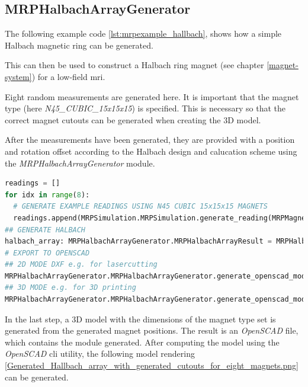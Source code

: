 \hypertarget{mrphalbacharraygenerator}{%
\subsection{MRPHalbachArrayGenerator}\label{mrphalbacharraygenerator}}

The following example code \ref{lst:mrpexample_hallbach}, shows how a
simple Halbach magnetic ring can be generated.

This can then be used to construct a Halbach ring magnet (see chapter
\ref{magnet-system}) for a low-field \gls{mri}.

Eight random measurements are generated here. It is important that the
magnet type (here \emph{N45\_CUBIC\_15x15x15}) is specified. This is
necessary so that the correct magnet cutouts can be generated when
creating the 3D model.

After the measurements have been generated, they are provided with a
position and rotation offset according to the Halbach design and
calucation scheme \cite{HallbachMagnetDesignPaper} using the
\emph{MRPHalbachArrayGenerator} module.

\begin{lstlisting}[language=Python, caption={MRPHalbachArrayGenerator example for generating an OpenSCAD based halbach ring}, label=lst:mrpexample_halbach]
readings = []
for idx in range(8):
  # GENERATE EXAMPLE READINGS USING N45 CUBIC 15x15x15 MAGNETS
  readings.append(MRPSimulation.MRPSimulation.generate_reading(MRPMagnetTypes.MagnetType.N45_CUBIC_15x15x15))
## GENERATE HALBACH
halbach_array: MRPHalbachArrayGenerator.MRPHalbachArrayResult = MRPHalbachArrayGenerator.MRPHalbachArrayGenerator.generate_1k_halbach_using_polarisation_direction(readings)
# EXPORT TO OPENSCAD
## 2D MODE DXF e.g. for lasercutting
MRPHalbachArrayGenerator.MRPHalbachArrayGenerator.generate_openscad_model([halbach_array], "./2d_test.scad",_2d_object_code=True)
## 3D MODE e.g. for 3D printing
MRPHalbachArrayGenerator.MRPHalbachArrayGenerator.generate_openscad_model([halbach_array], "./3d_test.scad",_2d_object_code=False)
\end{lstlisting}

In the last step, a 3D model with the dimensions of the magnet type set
is generated from the generated magnet positions. The result is an
\emph{OpenSCAD} \cite{OpenSCAD} file, which contains the module
generated. After computing the model using the \emph{OpenSCAD} \gls{cli}
utility, the following model rendering
\ref{Generated_Hallbach_array_with_generated_cutouts_for_eight_magnets.png}
can be generated.

